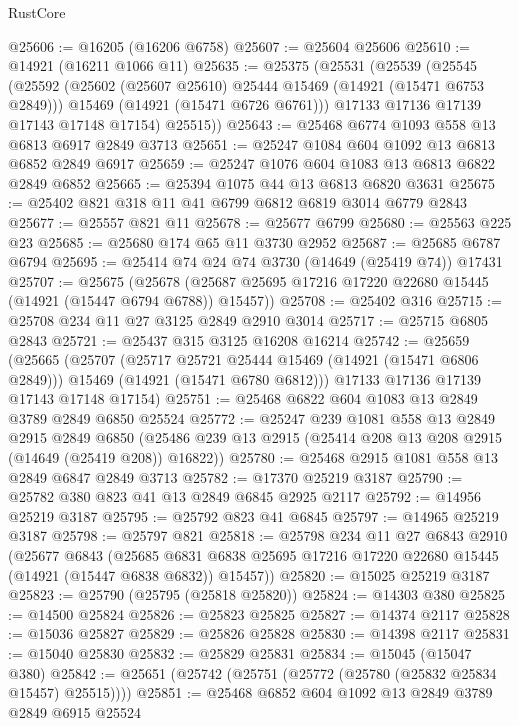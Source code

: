 \begin{lexlean}{RustCore}
\begin{coremodule}
@25606 := @16205 (@16206 @6758)
@25607 := @25604 @25606
@25610 := @14921 (@16211 @1066 @11)
@25635 := @25375
    (@25531
      (@25539
        (@25545
          (@25592
            (@25602 (@25607 @25610) @25444 @15469 (@14921 (@15471 @6753 @2849)))
            @15469
            (@14921 (@15471 @6726 @6761)))
          @17133
          @17136
          @17139
          @17143
          @17148
          @17154)
        @25515))
@25643 := @25468 @6774 @1093 @558 @13 @6813 @6917 @2849 @3713
@25651 := @25247 @1084 @604 @1092 @13 @6813 @6852 @2849 @6917
@25659 := @25247 @1076 @604 @1083 @13 @6813 @6822 @2849 @6852
@25665 := @25394 @1075 @44 @13 @6813 @6820 @3631
@25675 := @25402 @821 @318 @11 @41 @6799 @6812 @6819 @3014 @6779 @2843
@25677 := @25557 @821 @11
@25678 := @25677 @6799
@25680 := @25563 @225 @23
@25685 := @25680 @174 @65 @11 @3730 @2952
@25687 := @25685 @6787 @6794
@25695 := @25414 @74 @24 @74 @3730 (@14649 (@25419 @74)) @17431
@25707 := @25675
    (@25678 (@25687 @25695 @17216 @17220 @22680 @15445 (@14921 (@15447 @6794 @6788)) @15457))
@25708 := @25402 @316
@25715 := @25708 @234 @11 @27 @3125 @2849 @2910 @3014
@25717 := @25715 @6805 @2843
@25721 := @25437 @315 @3125 @16208 @16214
@25742 := @25659
    (@25665
      (@25707
        (@25717 @25721 @25444 @15469 (@14921 (@15471 @6806 @2849)))
        @15469
        (@14921 (@15471 @6780 @6812)))
      @17133
      @17136
      @17139
      @17143
      @17148
      @17154)
@25751 := @25468 @6822 @604 @1083 @13 @2849 @3789 @2849 @6850 @25524
@25772 := @25247
    @239
    @1081
    @558
    @13
    @2849
    @2915
    @2849
    @6850
    (@25486 @239 @13 @2915 (@25414 @208 @13 @208 @2915 (@14649 (@25419 @208)) @16822))
@25780 := @25468 @2915 @1081 @558 @13 @2849 @6847 @2849 @3713
@25782 := @17370 @25219 @3187
@25790 := @25782 @380 @823 @41 @13 @2849 @6845 @2925 @2117
@25792 := @14956 @25219 @3187
@25795 := @25792 @823 @41 @6845
@25797 := @14965 @25219 @3187
@25798 := @25797 @821
@25818 := @25798
    @234
    @11
    @27
    @6843
    @2910
    (@25677
      @6843
      (@25685 @6831 @6838 @25695 @17216 @17220 @22680 @15445 (@14921 (@15447 @6838 @6832)) @15457))
@25820 := @15025 @25219 @3187
@25823 := @25790 (@25795 (@25818 @25820))
@25824 := @14303 @380
@25825 := @14500 @25824
@25826 := @25823 @25825
@25827 := @14374 @2117
@25828 := @15036 @25827
@25829 := @25826 @25828
@25830 := @14398 @2117
@25831 := @15040 @25830
@25832 := @25829 @25831
@25834 := @15045 (@15047 @380)
@25842 := @25651 (@25742 (@25751 (@25772 (@25780 (@25832 @25834 @15457) @25515))))
@25851 := @25468 @6852 @604 @1092 @13 @2849 @3789 @2849 @6915 @25524

\end{coremodule}
\end{lexlean}
